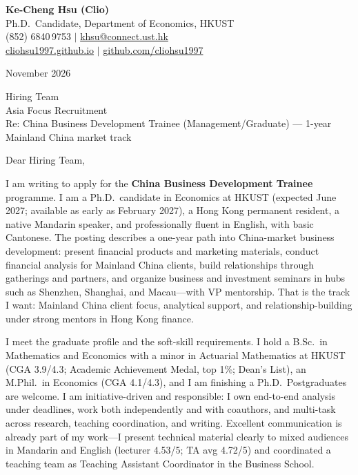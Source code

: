 \documentclass[11pt,letterpaper]{article}
\begin{document}
\noindent
{\bfseries Ke-Cheng Hsu (Clio)}\\
Ph.D.\ Candidate, Department of Economics, HKUST\\
(852) 6840\,9753 \quad $|$ \quad \href{mailto:khsu@connect.ust.hk}{khsu@connect.ust.hk}\\
\href{https://cliohsu1997.github.io/}{cliohsu1997.github.io} \quad $|$ \quad \href{https://github.com/cliohsu1997}{github.com/cliohsu1997}

\vspace{0.3em}
 November 2026

\vspace{0.2em}
\noindent
Hiring Team\\
Asia Focus Recruitment\\
Re: China Business Development Trainee (Management/Graduate) --- 1-year Mainland China market track

\vspace{0.1em}
Dear Hiring Team,

I am writing to apply for the \textbf{China Business Development Trainee} programme. I am a Ph.D.\ candidate in Economics at HKUST (expected June 2027; available as early as February 2027), a Hong Kong permanent resident, a native Mandarin speaker, and professionally fluent in English, with basic Cantonese. The posting describes a one-year path into China-market business development: present financial products and marketing materials, conduct financial analysis for Mainland China clients, build relationships through gatherings and partners, and organize business and investment seminars in hubs such as Shenzhen, Shanghai, and Macau---with VP mentorship. That is the track I want: Mainland China client focus, analytical support, and relationship-building under strong mentors in Hong Kong finance.

I meet the graduate profile and the soft-skill requirements. I hold a B.Sc.\ in Mathematics and Economics with a minor in Actuarial Mathematics at HKUST (CGA 3.9/4.3; Academic Achievement Medal, top 1\%; Dean's List), an M.Phil.\ in Economics (CGA 4.1/4.3), and I am finishing a Ph.D.\ Postgraduates are welcome. I am initiative-driven and responsible: I own end-to-end analysis under deadlines, work both independently and with coauthors, and multi-task across research, teaching coordination, and writing. Excellent communication is already part of my work---I present technical material clearly to mixed audiences in Mandarin and English (lecturer 4.53/5; TA avg 4.72/5) and coordinated a teaching team as Teaching Assistant Coordinator in the Business School.
\end{document}
